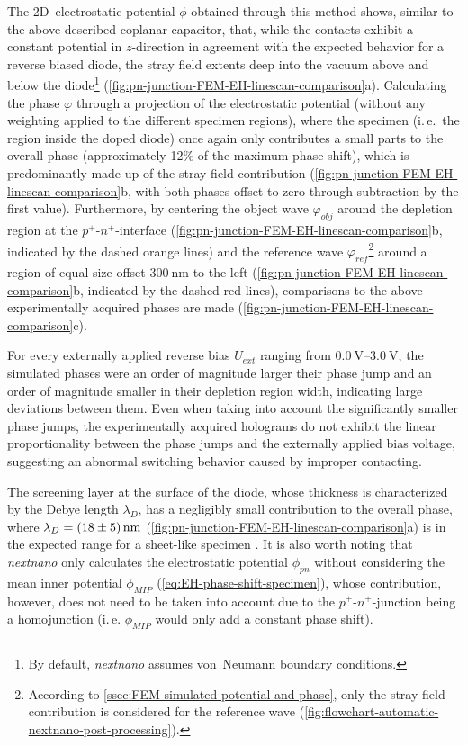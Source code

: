 The 2D~electrostatic potential $\phi$ obtained through this method shows, similar to the above described coplanar capacitor, that, while the contacts exhibit a constant potential in $z$-direction in agreement with the expected behavior for a reverse biased diode, the stray field extents deep into the vacuum above and below the diode\footnote{By default, \emph{nextnano} assumes von~Neumann boundary conditions.} (\cref{fig:pn-junction-FEM-EH-linescan-comparison}a). Calculating the phase $\varphi$ through a projection of the electrostatic potential (without any weighting applied to the different specimen regions), where the specimen (i.\,e.\ the region inside the doped diode) once again only contributes a small parts to the overall phase (approximately 12\% of the maximum phase shift), which is predominantly made up of the stray field contribution (\cref{fig:pn-junction-FEM-EH-linescan-comparison}b, with both phases offset to zero through subtraction by the first value). Furthermore, by centering the object wave $\varphi_{\mathit{obj}}$ around the depletion region at the $p^+$-$n^+$-interface (\cref{fig:pn-junction-FEM-EH-linescan-comparison}b, indicated by the dashed orange lines) and the reference wave $\varphi_{\mathit{ref}}$\footnote{According to \cref{ssec:FEM-simulated-potential-and-phase}, only the stray field contribution is considered for the reference wave (\cref{fig:flowchart-automatic-nextnano-post-processing}).} around a region of equal size offset $\SI{300}{\nm}$ to the left (\cref{fig:pn-junction-FEM-EH-linescan-comparison}b, indicated by the dashed red lines), comparisons to the above experimentally acquired phases are made (\cref{fig:pn-junction-FEM-EH-linescan-comparison}c).

For every externally applied reverse bias $U_{\mathit{ext}}$ ranging from $\SIrange{0.0}{3.0}{\volt}$, the simulated phases were an order of magnitude larger their phase jump and an order of magnitude smaller in their depletion region width, indicating large deviations between them. Even when taking into account the significantly smaller phase jumps, the experimentally acquired holograms do not exhibit the linear proportionality between the phase jumps and the externally applied bias voltage, suggesting an abnormal switching behavior caused by improper contacting.

The screening layer at the surface of the diode, whose thickness is characterized by the Debye length $\lambda_D$, has a negligibly small contribution to the overall phase, where $\lambda_D = \SI{18 \pm 5}{\nm}$ (\cref{fig:pn-junction-FEM-EH-linescan-comparison}a) is in the expected range for a sheet-like specimen \cite{Gurugubelli2015}. It is also worth noting that \emph{nextnano} only calculates the electrostatic potential $\phi_{\mathit{pn}}$ without considering the mean inner potential $\phi_{\mathit{MIP}}$ (\cref{eq:EH-phase-shift-specimen}), whose contribution, however, does not need to be taken into account due to the $p^+$-$n^+$-junction being a homojunction (i.\,e. $\phi_{\mathit{MIP}}$ would only add a constant phase shift).

